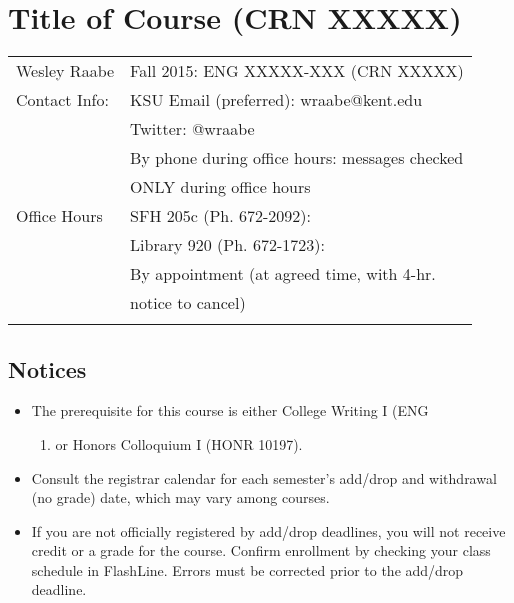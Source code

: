 \documentclass[]{article}
\begin{document}
\section{Title of Course (CRN XXXXX)}\label{title-of-course-crn-xxxxx}

\begin{longtable}[c]{@{}ll@{}}
\toprule\addlinespace
Wesley Raabe & Fall 2015: ENG XXXXX-XXX (CRN XXXXX)
\\\addlinespace
Contact Info: & KSU Email (preferred): wraabe@kent.edu
\\\addlinespace
& Twitter: @wraabe
\\\addlinespace
& By phone during office hours: messages checked
\\\addlinespace
& ONLY during office hours
\\\addlinespace
Office Hours & SFH 205c (Ph. 672-2092):
\\\addlinespace
& Library 920 (Ph. 672-1723):
\\\addlinespace
& By appointment (at agreed time, with 4-hr.
\\\addlinespace
& notice to cancel)
\\\addlinespace
\bottomrule
\end{longtable}

\subsection{Notices}\label{notices}

\begin{itemize}
\itemsep1pt\parskip0pt
\item
  The prerequisite for this course is either College Writing I (ENG

  \begin{enumerate}
  \def\labelenumi{\arabic{enumi})}
  \setcounter{enumi}{11010}
  \itemsep1pt\parskip0pt
  \item
    or Honors Colloquium I (HONR 10197).
  \end{enumerate}
\item
  Consult the registrar calendar for each semester's add/drop and
  withdrawal (no grade) date, which may vary among courses.
\item
  If you are not officially registered by add/drop deadlines, you will
  not receive credit or a grade for the course. Confirm enrollment by
  checking your class schedule in FlashLine. Errors must be corrected
  prior to the add/drop deadline.
\end{itemize}
\end{document}
